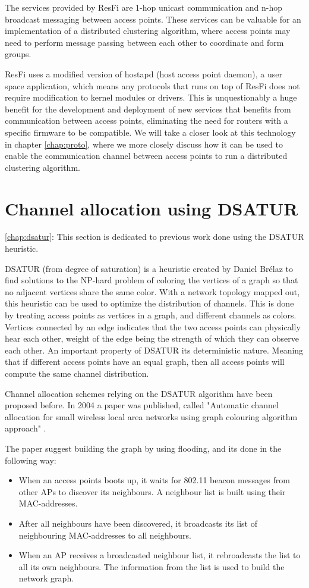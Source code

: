 The services provided by ResFi are 1-hop unicast communication and n-hop broadcast messaging between access points. These services can be valuable for an
implementation of a distributed clustering algorithm, where access points
may need to perform message passing between each other to coordinate and form groups. 

ResFi uses a modified version of hostapd (host access point daemon), a user space application, which means any
protocols that runs on top of ResFi does not require modification to kernel modules or drivers. This is unquestionably a huge benefit for the development and deployment of
new services that benefits from communication between access points, eliminating the need for routers with a specific firmware to be compatible. 
We will take a closer look at this technology in chapter \ref{chap:proto}, where we more closely discuss how it can be used to enable the
communication channel between access points to run a distributed clustering algorithm. 


\section{Channel allocation using DSATUR} 
\ref{chap:dsatur}:
This section is dedicated to previous work done using the DSATUR heuristic.

DSATUR (from degree of saturation) is a heuristic created by Daniel Brélaz \cite{Brelaz} to find solutions to the NP-hard problem of coloring the vertices of a graph so that no adjacent vertices share the same color.  With a network topology mapped out, this heuristic can be used to optimize the distribution of channels. This is done by treating access points as vertices in a graph, and different channels as colors. Vertices connected by an edge indicates that the two access points can physically hear each other, weight of the edge being the strength of which they can observe each other.  An
important property of DSATUR its deterministic nature. Meaning that if different access points have an equal graph, then all access points will compute the same channel distribution.

Channel allocation schemes relying on the DSATUR algorithm have been proposed before. In 2004 a paper was published, called
"Automatic channel allocation for small wireless local area networks using graph colouring algorithm approach" \cite{mahonen}.

The paper suggest building the graph by using flooding, and its done in the following way:
\begin{itemize}
	\item When an access points boots up, it waits for 802.11 beacon messages from other APs to discover its neighbours. A neighbour list is built using their MAC-addresses. 
	\item After all neighbours have been discovered, it broadcasts its list of neighbouring MAC-addresses to all neighbours.  
	\item When an AP receives a broadcasted neighbour list, it rebroadcasts the list to all its own neighbours. The information from the list is used to build the network graph. 
\end{itemize}

